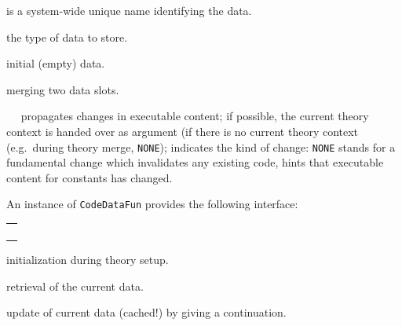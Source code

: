 \begin{isabellebody}
\begin{isamarkuptext}
  \begin{description}

  \item {} is a system-wide unique name identifying the data.

  \item {} the type of data to store.

  \item {} initial (empty) data.

  \item {} merging two data slots.

  \item {}~~ propagates changes in executable content;
    if possible, the current theory context is handed over
    as argument  (if there is no current theory context (e.g.~during
    theory merge, \verb|NONE|);  indicates the kind
    of change: \verb|NONE| stands for a fundamental change
    which invalidates any existing code, 
    hints that executable content for constants 
    has changed.

  \end{description}

  An instance of \verb|CodeDataFun| provides the following
  interface:

  \medskip
  \begin{tabular}{l}
  \isa{init{\isacharcolon}\ theory\ {\isasymrightarrow}\ theory} \\
  \isa{get{\isacharcolon}\ theory\ {\isasymrightarrow}\ T} \\
  \isa{change{\isacharcolon}\ theory\ {\isasymrightarrow}\ {\isacharparenleft}T\ {\isasymrightarrow}\ T{\isacharparenright}\ {\isasymrightarrow}\ T} \\
  \isa{change{\isacharunderscore}yield{\isacharcolon}\ theory\ {\isasymrightarrow}\ {\isacharparenleft}T\ {\isasymrightarrow}\ {\isacharprime}a\ {\isacharasterisk}\ T{\isacharparenright}\ {\isasymrightarrow}\ {\isacharprime}a\ {\isacharasterisk}\ T}
  \end{tabular}

  \begin{description}

  \item {} initialization during theory setup.

  \item {} retrieval of the current data.

  \item {} update of current data (cached!)
    by giving a continuation.


\end{description}
\end{isamarkuptext}
\end{isabellebody}
